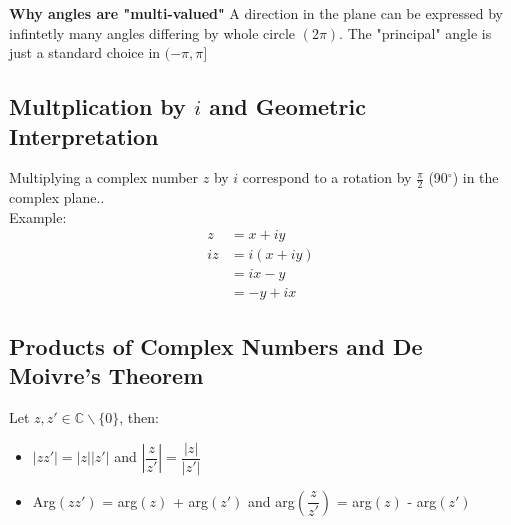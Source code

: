 \documentclass[12pt]{article}
\theoremstyle{definition}
\theoremstyle{plain}
\begin{document}
\noindent \textbf{Why angles are "multi-valued"}
A direction in the plane can be expressed by infintetly many angles differing by whole circle $(2\pi)$. The "principal" angle is just a standard choice in $(-\pi, \pi]$

\subsection{Multplication by $i$ and Geometric Interpretation}
Multiplying a complex number $z$ by $i$ correspond to a rotation by $\frac{\pi}{2}$ (90$^\circ$) in the complex plane.. \\ 
Example:
\begin{align*}
  z &= x + iy \\
  iz &= i(x + iy) \\
  &= ix - y \\
  &= -y + ix
\end{align*}

\begin{center}
\end{center}

\subsection{Products of Complex Numbers and De Moivre's Theorem}
\begin{theorembox}
Let $z, z' \in \mathbb{C} \backslash \{0\}$, then:
\begin{itemize}
  \item $|zz'| = |z||z'|$ and $\left|\dfrac{z}{z'}\right| = \dfrac{|z|}{|z'|}$
  \item Arg$(zz')$ = arg$(z)$ + arg$(z')$ and arg$\left(\dfrac{z}{z'}\right)$ = arg$(z)$ - arg$(z')$
\end{itemize}
\end{theorembox}
\end{document}
